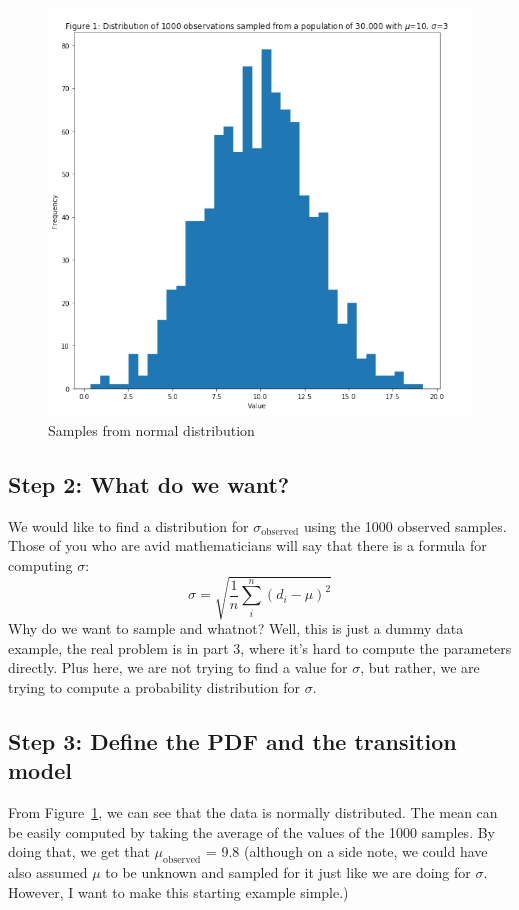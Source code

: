 \begin{figure}[h]
    \centering
\includegraphics[width=.6\textwidth]{pic/p05c09-snip02}
    \caption{Samples from normal distribution}
    \label{fig:p05c09-snip02}
\end{figure}


\subsection{Step 2: What do we want?}
We would like to find a distribution for $\sigma_\textrm{observed}$ using the 1000 observed samples. Those of you who are avid mathematicians will say that there is a formula for computing $\sigma$:
\begin{equation}
\sigma=\sqrt{\frac{1}{n} \sum_{i}^{n}\left(d_{i}-\mu\right)^{2}}
\end{equation}
Why do we want to sample and whatnot? Well, this is just a dummy data example, the real problem is in part 3, where it's hard to compute the parameters directly. Plus here, we are not trying to find a value for $\sigma$, but rather, we are trying to compute a probability distribution for $\sigma$.

\subsection{Step 3: Define the PDF and the transition model}
From Figure~\ref{fig:p05c09-snip02}, we can see that the data is normally distributed. The mean can be easily computed by taking the average of the values of the 1000 samples. By doing that, we get that  $\mu_\textrm{observed}$ = 9.8 (although on a side note, we could have also assumed  $\mu$ to be unknown and sampled for it just like we are doing for $\sigma$. However, I want to make this starting example simple.)

